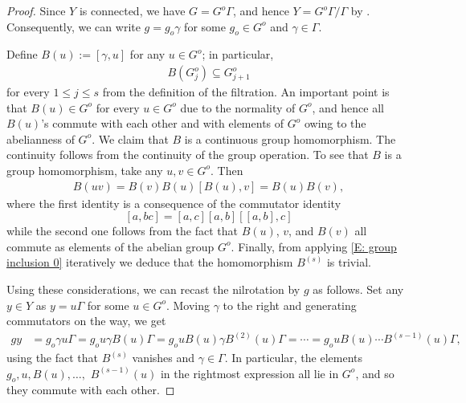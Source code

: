 \documentclass[11pt]{amsart}
\theoremstyle{definition}
\newcommand{\1}{{\mathbf{1}}}
\begin{document}
\begin{proof}
    Since $Y$ is connected, we have $G=G^o\Gamma$, and hence $Y=G^{o}\Gamma/\Gamma$ by \cite[Chapter 10, Lemma~11]{HK18}. %
Consequently, we can write $g = g_o \gamma$ for some $g_o\in G^o$ and $\gamma\in \Gamma$. 

Define $B(u) := [\gamma,u]$ for any $u\in G^o$; in particular,
\begin{align}\label{E: group inclusion 0}
 B(G_{j}^o)\subseteq G_{j+1}^o   
\end{align}
for every $1\leq j\leq s$ from the definition of the filtration. An important point is that $B(u)\in G^o$ for every $u\in G^o$ due to the normality of $G^o$, and hence all $B(u)$'s commute with each other and with elements of $G^o$ owing to the abelianness of $G^o$. We claim that $B$ is a continuous group homomorphism. The continuity follows from the continuity of the group operation. To see that $B$ is a group homomorphism, take any $u,v\in G^o$. Then
    \begin{align*}
        B(u v) = B(v)B(u)[B(u),v] = B(u)B(v),
    \end{align*}
    where the first identity is a consequence of the commutator identity $$[a,bc] = [a,c][a,b][[a,b],c]$$
    while the second one follows from the fact that $B(u)$, $v$, and $B(v)$ all commute as elements of the abelian group $G^o$. 
    Finally, from applying \eqref{E: group inclusion 0} iteratively we deduce that the homomorphism $B^{(s)}$ is trivial. 

Using these considerations, we can recast the nilrotation by $g$ as follows. Set any $y\in Y$ as $y=u\Gamma$ for some $u\in G^o$. Moving $\gamma$ to the right and generating commutators on the way, we get
    \begin{align*}
        gy &= g_o\gamma u\Gamma = g_o u\gamma B(u)\Gamma = g_o u B(u)\gamma B^{(2)}(u)\Gamma = \cdots
        = g_o u B(u)\cdots B^{(s-1)}(u) \Gamma,    
    \end{align*}
    using the fact that $B^{(s)}$ vanishes and $\gamma\in\Gamma$. In particular, the elements $g_o, u, B(u), \ldots,$ $B^{(s-1)}(u)$ in the rightmost expression all lie in $G^o$, and so they commute with each other. 


\end{proof}
\end{document}
